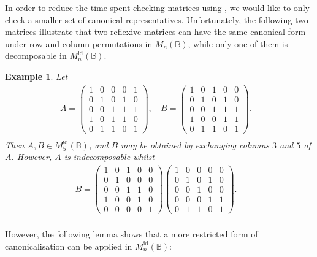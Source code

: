 \documentclass[11pt]{article}
\newtheorem{ex}[thm]{Example}
\numberwithin{equation}{section}
\newcommand{\B}{\mathbb{B}}
\newcommand{\Bn}{M_n(\B)}
\newcommand{\Refn}{M_n^{\text{id}}(\B)}
\newcommand{\Ref}[1]{M_{#1}^{\text{id}}(\B)}
\begin{document}
In order to reduce the time spent checking matrices using
, we would like to only check a smaller set of
canonical representatives. Unfortunately, the following two matrices illustrate
that two reflexive matrices can have the same canonical form under row and
column permutations in $\Bn$, while only one of them is decomposable in $\Refn$. 
\begin{ex}
  Let
\begin{align*}
  A = \begin{pmatrix}
    1 & 0 & 0 & 0 & 1 \\
    0 & 1 & 0 & 1 & 0 \\
    0 & 0 & 1 & 1 & 1 \\
    1 & 0 & 1 & 1 & 0 \\
    0 & 1 & 1 & 0 & 1 
  \end{pmatrix}\text{, }&
  B = \begin{pmatrix}
    1 & 0 & 1 & 0 & 0 \\
    0 & 1 & 0 & 1 & 0 \\
    0 & 0 & 1 & 1 & 1 \\
    1 & 0 & 0 & 1 & 1 \\
    0 & 1 & 1 & 0 & 1 
  \end{pmatrix}.&\\
\end{align*}
Then $A, B \in \Ref{5}$, and $B$ may be obtained by exchanging columns $3$ and
$5$ of $A$. However, $A$ is indecomposable whilst
\begin{align*}
  B = \begin{pmatrix}
    1 & 0 & 1 & 0 & 0 \\
    0 & 1 & 0 & 0 & 0 \\
    0 & 0 & 1 & 1 & 0 \\
    1 & 0 & 0 & 1 & 0 \\
    0 & 0 & 0 & 0 & 1 
  \end{pmatrix}
  \begin{pmatrix}
    1 & 0 & 0 & 0 & 0 \\
    0 & 1 & 0 & 1 & 0 \\
    0 & 0 & 1 & 0 & 0 \\
    0 & 0 & 0 & 1 & 1 \\
    0 & 1 & 1 & 0 & 1 
  \end{pmatrix}.&\\
\end{align*}
\end{ex} 

However, the following lemma shows that a more restricted form of
canonicalisation can be applied in $\Refn$:
\end{document}
